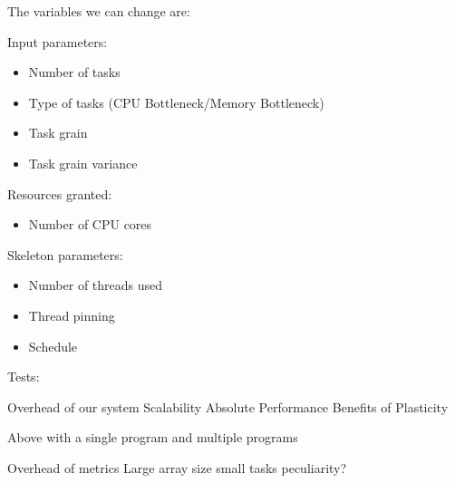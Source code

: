 The variables we can change are:

Input parameters:

\begin{itemize}
	\item Number of tasks
	\item Type of tasks (CPU Bottleneck/Memory Bottleneck)
	\item Task grain
	\item Task grain variance
\end{itemize}

Resources granted:

\begin{itemize}
	\item Number of CPU cores
\end{itemize}

Skeleton parameters:

\begin{itemize}
	\item Number of threads used
	\item Thread pinning
	\item Schedule
\end{itemize}




Tests:

Overhead of our system
Scalability
Absolute Performance
Benefits of Plasticity

Above with a single program and multiple programs

Overhead of metrics
Large array size small tasks peculiarity?